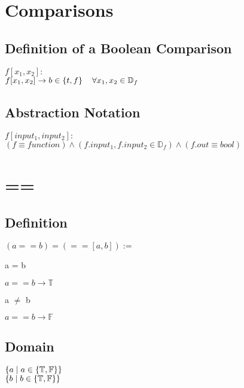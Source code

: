 \documentclass[11pt]{article}
\begin{document}
\section{Comparisons}


\subsection{Definition of a Boolean Comparison}
\vspace{3mm}
\begin{center}
$
f[x_1,x_2] :
$
\\ \vspace{2mm}
$
f[x_1,x_2] \rightarrow b \in \{ t,f \} \hspace{4mm} \forall x_1,x_2 \in \mathbb{D}_f
$
\end{center}

\subsection{Abstraction Notation}
\begin{center}
$
f[input_1,input_2] :
$
\\ \vspace{2mm}
$
(f \equiv function) \land (f.input_1, f.input_2 \in \mathbb{D}_f) \land (f.out \equiv bool)
$
\end{center}


\section{==}
\subsection{Definition}
\begin{center}
$
(a == b) = (==[a,b]) :=
$
\end{center}
a = b
\begin{center}
$
a == b \rightarrow \mathbb{T}
$
\end{center}
\vspace{2mm}
a $\neq$ b
\begin{center}
$
a == b \rightarrow \mathbb{F}
$
\end{center}
\subsection{Domain}
\begin{center}
$
\{a \hspace{1mm} | \hspace{1mm} a \in \{\mathbb{T},\mathbb{F}\} \}
$
\\ \vspace{2mm}
$
\{b \hspace{1mm} | \hspace{1mm} b \in \{\mathbb{T},\mathbb{F}\} \}
$
\end{center}
\end{document}
